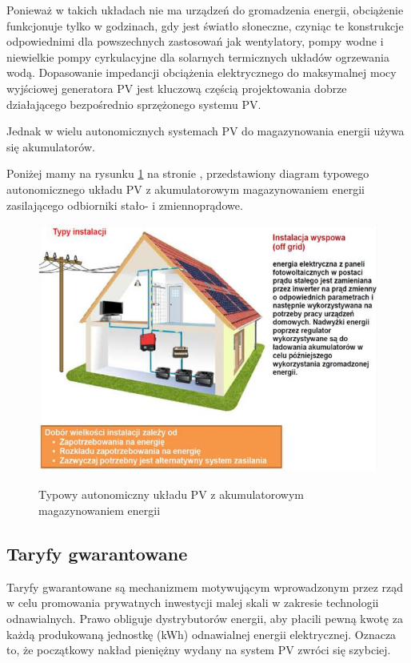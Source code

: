 \documentclass[12pt,a4paper]{article}
\begin{document}
Ponieważ w takich układach nie ma urządzeń do gromadzenia energii, 
obciążenie funkcjonuje tylko w godzinach, gdy jest światło słoneczne, 
czyniąc te konstrukcje odpowiednimi dla powszechnych zastosowań jak 
wentylatory, pompy wodne i niewielkie pompy cyrkulacyjne dla solarnych 
termicznych układów ogrzewania wodą. Dopasowanie impedancji obciążenia 
elektrycznego do maksymalnej mocy wyjściowej generatora PV jest kluczową 
częścią projektowania dobrze działającego bezpośrednio sprzężonego 
systemu PV. 

Jednak w wielu autonomicznych systemach PV do magazynowania energii 
używa się akumulatorów. 

Poniżej mamy na rysunku \ref{fig:off-grid} na stronie \pageref{fig:off-grid} , przedstawiony diagram typowego autonomicznego układu PV z 
akumulatorowym magazynowaniem energii zasilającego odbiorniki stało- i 
zmiennoprądowe. 

\begin{figure}[h]
\centering
\caption{Typowy autonomiczny układu PV z akumulatorowym magazynowaniem energii}
\includegraphics[natwidth=16.60cm,natheight=12.13cm]{media/image4.png}
\label{fig:off-grid}
\end{figure}

\subsection{Taryfy gwarantowane}

Taryfy gwarantowane  są mechanizmem motywującym wprowadzonym przez rząd w 
celu promowania prywatnych inwestycji malej skali w zakresie technologii 
odnawialnych. Prawo obliguje dystrybutorów energii, aby płacili pewną 
kwotę za każdą produkowaną jednostkę (kWh) odnawialnej energii 
elektrycznej. Oznacza to, że początkowy nakład pieniężny wydany na 
system PV zwróci się szybciej. 
\end{document}
